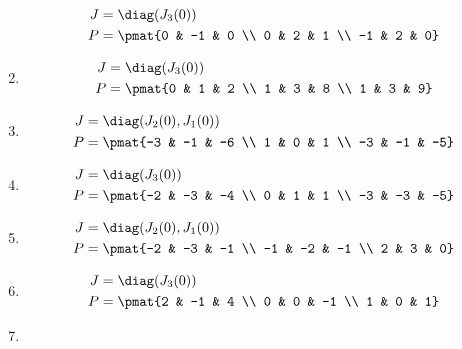 \begin{enumerate}
\begin{align*}
J &= \diag(J_{3}(0))\\
P &= \pmat{0 & -1 & 0 \\ 0 & 2 & 1 \\ -1 & 2 & 0}
\end{align*}

\item

\begin{align*}
J &= \diag(J_{3}(0))\\
P &= \pmat{0 & 1 & 2 \\ 1 & 3 & 8 \\ 1 & 3 & 9}
\end{align*}

\item

\begin{align*}
J &= \diag(J_{2}(0), J_{1}(0))\\
P &= \pmat{-3 & -1 & -6 \\ 1 & 0 & 1 \\ -3 & -1 & -5}
\end{align*}

\item

\begin{align*}
J &= \diag(J_{3}(0))\\
P &= \pmat{-2 & -3 & -4 \\ 0 & 1 & 1 \\ -3 & -3 & -5}
\end{align*}

\item

\begin{align*}
J &= \diag(J_{2}(0), J_{1}(0))\\
P &= \pmat{-2 & -3 & -1 \\ -1 & -2 & -1 \\ 2 & 3 & 0}
\end{align*}

\item

\begin{align*}
J &= \diag(J_{3}(0))\\
P &= \pmat{2 & -1 & 4 \\ 0 & 0 & -1 \\ 1 & 0 & 1}
\end{align*}

\item


\end{enumerate}
